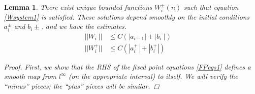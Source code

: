 \documentclass[12pt]{article}
\newtheorem{lemma}{Lemma}
\begin{document}
\begin{lemma}\label{inv1}
There exist unique bounded functions $W_i^\pm(n)$ such that equation \eqref{Wsystem1} is satisfied. These solutions depend smoothly on the initial conditions $a_i^\pm$ and $b_i\pm$, and we have the estimates.
\begin{equation}\label{Wipmest}
\begin{aligned}
||W_i^-|| &\leq C (|a_{i-1}^-| + |b_i^-|) \\
||W_i^+|| &\leq C (|a_i^+| + |b_i^+| )
\end{aligned}
\end{equation}

\begin{proof}
First, we show that the RHS of the fixed point equations \eqref{FPeqs1} defines a smooth map from $l^\infty$ (on the appropriate interval) to itself. We will verify the ``minus'' pieces; the ``plus'' pieces will be similar.


\end{proof}
\end{lemma}
\end{document}
